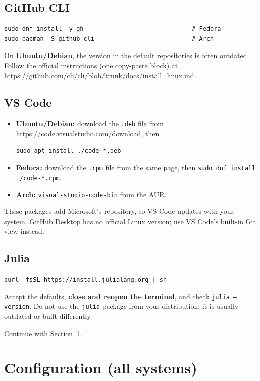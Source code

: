 \documentclass[11pt,a4paper]{article}
\newcommand{\cmd}[1]{\texttt{#1}}
\begin{document}
\subsection{GitHub CLI}
\begin{lstlisting}
sudo dnf install -y gh                              # Fedora
sudo pacman -S github-cli                           # Arch
\end{lstlisting}
On \textbf{Ubuntu/Debian}, the version in the default repositories is often outdated.
Follow the official instructions (one copy-paste block) at
\url{https://github.com/cli/cli/blob/trunk/docs/install_linux.md}.

\subsection{VS Code}
\begin{itemize}
  \item \textbf{Ubuntu/Debian:} download the \cmd{.deb} file from
        \url{https://code.visualstudio.com/download}, then
\begin{lstlisting}
sudo apt install ./code_*.deb
\end{lstlisting}
  \item \textbf{Fedora:} download the \cmd{.rpm} file from the same page, then
        \cmd{sudo dnf install ./code-*.rpm}.
  \item \textbf{Arch:} \cmd{visual-studio-code-bin} from the AUR.
\end{itemize}
These packages add Microsoft's repository, so VS Code updates with your system.
GitHub Desktop has no official Linux version; use VS Code's built-in Git view instead.

\subsection{Julia}
\begin{lstlisting}
curl -fsSL https://install.julialang.org | sh
\end{lstlisting}
Accept the defaults, \textbf{close and reopen the terminal}, and check
\cmd{julia --version}. Do not use the \cmd{julia} package from your distribution;
it is usually outdated or built differently.

Continue with Section~\ref{sec:config}.

\section{Configuration (all systems)}\label{sec:config}
\end{document}
